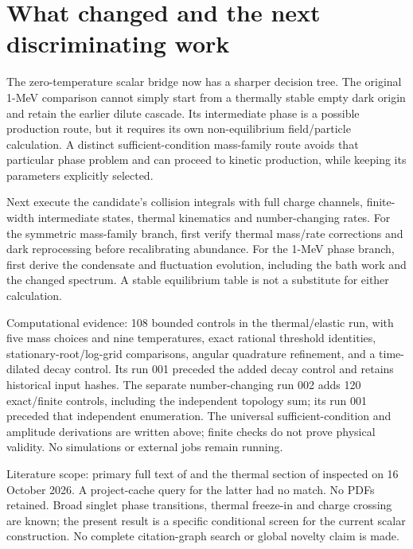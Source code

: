 \documentclass[11pt]{article}
\begin{document}
\section{What changed and the next discriminating work}
The zero-temperature scalar bridge now has a sharper decision tree.
The original 1-MeV comparison cannot simply start from a thermally stable
empty dark origin and retain the earlier dilute cascade. Its intermediate
phase is a possible production route, but it requires its own non-equilibrium
field/particle calculation. A distinct sufficient-condition mass-family
route avoids that particular phase problem and can proceed to kinetic
production, while keeping its parameters explicitly selected.

Next execute the candidate's collision integrals with full charge channels,
finite-width intermediate states, thermal kinematics and number-changing
rates. For the symmetric mass-family branch, first verify thermal mass/rate
corrections and dark reprocessing before recalibrating abundance. For the
1-MeV phase branch, first derive the condensate and fluctuation evolution,
including the bath work and the changed spectrum. A stable equilibrium
table is not a substitute for either calculation.

Computational evidence: 108 bounded controls in the thermal/elastic run, with
five mass choices and nine temperatures, exact rational threshold identities,
stationary-root/log-grid comparisons, angular quadrature refinement, and
a time-dilated decay control. Its run 001 preceded the added decay control and
retains historical input hashes. The separate number-changing run 002
adds 120 exact/finite controls, including the independent topology sum;
its run 001 preceded that independent enumeration. The universal
sufficient-condition and amplitude derivations are written above; finite checks do not
prove physical validity. No simulations or external jobs remain running.

Literature scope: primary full text of \cite{seller} and the thermal section
of \cite{deromeri} inspected on 16 October 2026. A project-cache query for
the latter had no match. No PDFs retained. Broad singlet phase transitions,
thermal freeze-in and charge crossing are known; the present result is a
specific conditional screen for the current scalar construction. No complete
citation-graph search or global novelty claim is made.
\end{document}
